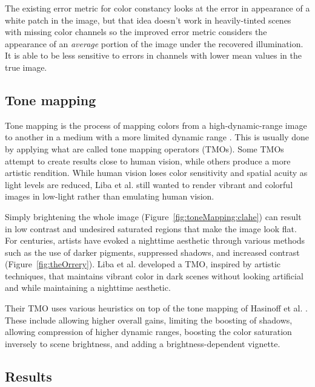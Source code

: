 \documentclass{sig-alternate}
\begin{document}
The existing error metric for color constancy looks at the error in appearance of a white patch in the image, but that idea doesn't work in heavily-tinted scenes with missing color channels so the improved error metric considers the appearance of an \emph{average} portion of the image under the recovered illumination. It is able to be less sensitive to errors in channels with lower mean values in the true image.~\cite{Liba2019}





\subsection{Tone mapping}
\label{sec:toneMapping}


Tone mapping is the process of mapping colors from a high-dynamic-range image to another in a medium with a more limited dynamic range \cite{wiki:ToneMapping}. 
This is usually done by applying what are called tone mapping operators (TMOs). Some TMOs attempt to create results close to human vision, while others produce a more artistic rendition. While human vision loses color sensitivity and spatial acuity as light levels are reduced, Liba et al. still wanted to render vibrant and colorful images in low-light rather than emulating human vision.~\cite{Liba2019}

Simply brightening the whole image (Figure~\ref{fig:toneMapping:clahe}) can result in low contrast and undesired saturated regions that make the image look flat. For centuries, artists have evoked a nighttime aesthetic through various methods such as the use of darker pigments, suppressed shadows, and increased contrast (Figure~\ref{fig:theOrrery}).
Liba et al. developed a TMO, inspired by artistic techniques, that maintains vibrant color in dark scenes without looking artificial and while maintaining a nighttime aesthetic. 

Their TMO uses various heuristics on top of the tone mapping of Hasinoff et al. \cite{Hasinoff2016}. These include allowing higher overall gains, limiting the boosting of shadows, allowing compression of higher dynamic ranges, boosting the color saturation inversely to scene brightness, and adding a brightness-dependent vignette.~\cite{Liba2019}





\subsection{Results}
\end{document}

